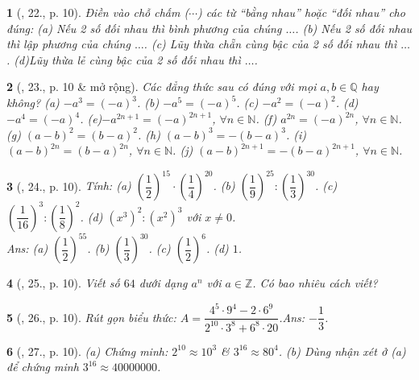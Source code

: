 \documentclass{article}
\newtheorem{baitoan}{}
\begin{document}
\begin{baitoan}[\cite{Binh_Toan_7_tap_1}, 22., p. 10]
	Điền vào chỗ chấm ($\cdots$) các từ ``bằng nhau'' hoặc ``đối nhau'' cho đúng: (a) Nếu 2 số đối nhau thì bình phương của chúng $\ldots$. (b) Nếu 2 số đối nhau thì lập phương của chúng $\ldots$. (c) Lũy thừa chẵn cùng bậc của 2 số đối nhau thì $\ldots$. (d)Lũy thừa lẻ cùng bậc của 2 số đối nhau thì $\ldots$.
\end{baitoan}

\begin{baitoan}[\cite{Binh_Toan_7_tap_1}, 23., p. 10 \& mở rộng]
	Các đẳng thức sau có đúng với mọi $a,b\in\mathbb{Q}$ hay không? (a) $-a^3 = (-a)^3$. (b) $-a^5 = (-a)^5$. (c) $-a^2 = (-a)^2$. (d)$-a^4 = (-a)^4$. (e)$-a^{2n+1} = (-a)^{2n+1}$, $\forall n\in\mathbb{N}$. (f) $a^{2n} = (-a)^{2n}$, $\forall n\in\mathbb{N}$. (g) $(a - b)^2 = (b - a)^2$. (h) $(a - b)^3 = -(b - a)^3$. (i) $(a - b)^{2n} = (b - a)^{2n}$, $\forall n\in\mathbb{N}$. (j) $(a - b)^{2n+1} = -(b - a)^{2n+1}$, $\forall n\in\mathbb{N}$.
\end{baitoan}

\begin{baitoan}[\cite{Binh_Toan_7_tap_1}, 24., p. 10]
	Tính: (a) $\left(\dfrac{1}{2}\right)^{15}\cdot\left(\dfrac{1}{4}\right)^{20}$. (b) $\left(\dfrac{1}{9}\right)^{25}:\left(\dfrac{1}{3}\right)^{30}$. (c) $\left(\dfrac{1}{16}\right)^3:\left(\dfrac{1}{8}\right)^2$. (d) $(x^3)^2:(x^2)^3$ với $x\ne 0$.\\\mbox{}\hfill{\sf Ans: (a) $\left(\dfrac{1}{2}\right)^{55}$. (b) $\left(\dfrac{1}{3}\right)^{30}$. (c) $\left(\dfrac{1}{2}\right)^6$. (d) $1$.}
\end{baitoan}

\begin{baitoan}[\cite{Binh_Toan_7_tap_1}, 25., p. 10]
	Viết số $64$ dưới dạng $a^n$ với $a\in\mathbb{Z}$. Có bao nhiêu cách viết?
\end{baitoan}

\begin{baitoan}[\cite{Binh_Toan_7_tap_1}, 26., p. 10]
	Rút gọn biểu thức: $A = \dfrac{4^5\cdot 9^4 - 2\cdot 6^9}{2^{10}\cdot 3^8 + 6^8\cdot 20}$.\hfill{\sf Ans: $-\dfrac{1}{3}$.}
\end{baitoan}

\begin{baitoan}[\cite{Binh_Toan_7_tap_1}, 27., p. 10]
	(a) Chứng minh: $2^{10}\approx 10^3$ \& $3^{16}\approx 80^4$. (b) Dùng nhận xét ở (a) để chứng minh $3^{16}\approx 40000000$.	
\end{baitoan}
\end{document}
